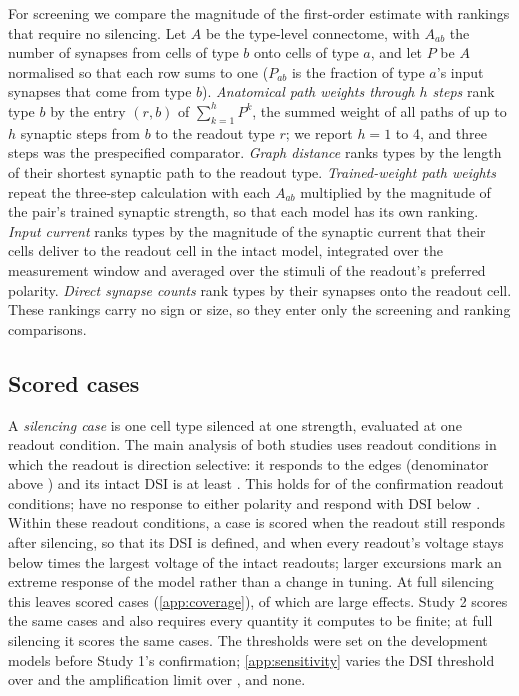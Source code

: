 For screening we compare the magnitude of the first-order estimate with rankings that require no silencing. Let $A$ be the type-level connectome, with $A_{ab}$ the number of synapses from cells of type $b$ onto cells of type $a$, and let $P$ be $A$ normalised so that each row sums to one ($P_{ab}$ is the fraction of type $a$'s input synapses that come from type $b$). \emph{Anatomical path weights through $h$ steps} rank type $b$ by the entry $(r,b)$ of $\sum_{k=1}^{h}P^k$, the summed weight of all paths of up to $h$ synaptic steps from $b$ to the readout type $r$; we report $h=1$ to 4, and three steps was the prespecified comparator. \emph{Graph distance} ranks types by the length of their shortest synaptic path to the readout type. \emph{Trained-weight path weights} repeat the three-step calculation with each $A_{ab}$ multiplied by the magnitude of the pair's trained synaptic strength, so that each model has its own ranking. \emph{Input current} ranks types by the magnitude of the synaptic current that their cells deliver to the readout cell in the intact model, integrated over the measurement window and averaged over the stimuli of the readout's preferred polarity. \emph{Direct synapse counts} rank types by their synapses onto the readout cell. These rankings carry no sign or size, so they enter only the screening and ranking comparisons.

\subsection{Scored cases}
\label{sec:scored}

A \emph{silencing case} is one cell type silenced at one strength, evaluated at one readout condition. The main analysis of both studies uses readout conditions in which the readout is direction selective: it responds to the edges (denominator above \DenomThreshold{}) and its intact DSI is at least \MainDSI{}. This holds for \MainReadouts{} of the \ReadoutConditions{} confirmation readout conditions; \Unresponsive{} have no response to either polarity and \LowDSI{} respond with DSI below \MainDSI{}. Within these readout conditions, a case is scored when the readout still responds after silencing, so that its DSI is defined, and when every readout's voltage stays below \AmpLimit{} times the largest voltage of the intact readouts; larger excursions mark an extreme response of the model rather than a change in tuning. At full silencing this leaves \MainCasesFull{} scored cases (\cref{app:coverage}), of which \LargeFull{} are large effects. Study 2 scores the same cases and also requires every quantity it computes to be finite; at full silencing it scores the same \NCasesFull{} cases. The thresholds were set on the development models before Study 1's confirmation; \cref{app:sensitivity} varies the DSI threshold over \DSIThresholdsOther{} and the amplification limit over \AmpLimitLow{}, \AmpLimitHigh{} and none.

